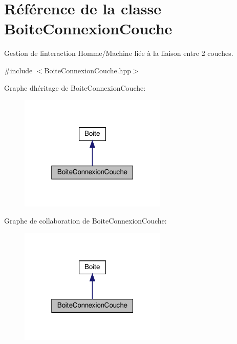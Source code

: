 \hypertarget{classBoiteConnexionCouche}{}\section{Référence de la classe Boite\+Connexion\+Couche}
\label{classBoiteConnexionCouche}


Gestion de l\textquotesingle{}interaction Homme/\+Machine liée à la liaison entre 2 couches.  




{\ttfamily \#include $<$Boite\+Connexion\+Couche.\+hpp$>$}



Graphe d\textquotesingle{}héritage de Boite\+Connexion\+Couche\+:
\nopagebreak
\begin{figure}[H]
\begin{center}
\leavevmode
\includegraphics[width=199pt]{classBoiteConnexionCouche__inherit__graph}
\end{center}
\end{figure}


Graphe de collaboration de Boite\+Connexion\+Couche\+:
\nopagebreak
\begin{figure}[H]
\begin{center}
\leavevmode
\includegraphics[width=199pt]{classBoiteConnexionCouche__coll__graph}
\end{center}
\end{figure}
